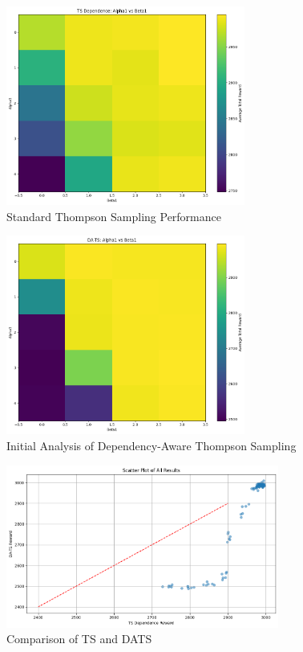 \documentclass[11pt]{article}
\begin{document}
\begin{figure}[H]
    \centering
    \includegraphics[width=0.7\textwidth]{pics/ts1.png}
    \caption{Standard Thompson Sampling Performance}
    \label{fig:dep_ts_standard}
\end{figure}

\begin{figure}[H]
    \centering
    \includegraphics[width=0.7\textwidth]{pics/dats1.png}
    \caption{Initial Analysis of Dependency-Aware Thompson Sampling}
    \label{fig:dep_dats_initial}
\end{figure}

\begin{figure}[H]
    \centering
    \includegraphics[width=0.8\textwidth]{pics/ts_dats2.png}
    \caption{Comparison of TS and DATS}
    \label{fig:comparison of TS and DATS}
\end{figure}
\end{document}
